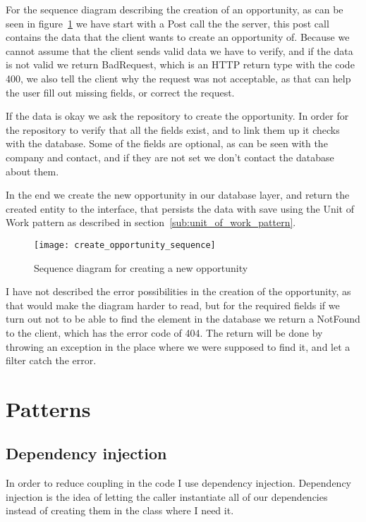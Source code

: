 For the sequence diagram describing the creation of an opportunity, as can be
seen in figure~\ref{fig:opportunity_sequence} we have start with a Post call the
the server, this post call contains the data that the client wants to create an
opportunity of. Because we cannot assume that the client sends valid data we have
to verify, and if the data is not valid we return BadRequest, which is an HTTP
return type with the code 400, we also tell the client why the request was not
acceptable, as that can help the user fill out missing fields, or correct the
request. 

If the data is okay we ask the repository to create the opportunity. In order
for the repository to verify that all the fields exist, and to link them up it
checks with the database. Some of the fields are optional, as can be seen with
the company and contact, and if they are not set we don't contact the database
about them.

In the end we create the new opportunity in our database layer, and return the
created entity to the interface, that persists the data with save using the Unit
of Work pattern as described in section~\ref{sub:unit_of_work_pattern}.

\begin{figure}[!htb]
  \centering
  \texttt{[image: create\_opportunity\_sequence]}
  \caption{Sequence diagram for creating a new opportunity}
  \label{fig:opportunity_sequence}
\end{figure}

I have not described the error possibilities in the creation of the opportunity,
as that would make the diagram harder to read, but for the required fields if we
turn out not to be able to find the element in the database we return a NotFound
to the client, which has the error code of 404. The return will be done by
throwing an exception in the place where we were supposed to find it, and let a
filter catch the error.

\section{Patterns}
\label{sec:Patterns}

\subsection{Dependency injection}
\label{sub:dependency_injection}
In order to reduce coupling in the code I use dependency injection.
Dependency injection is the idea of letting the caller instantiate all of our
dependencies instead of creating them in the class where I need it. 

